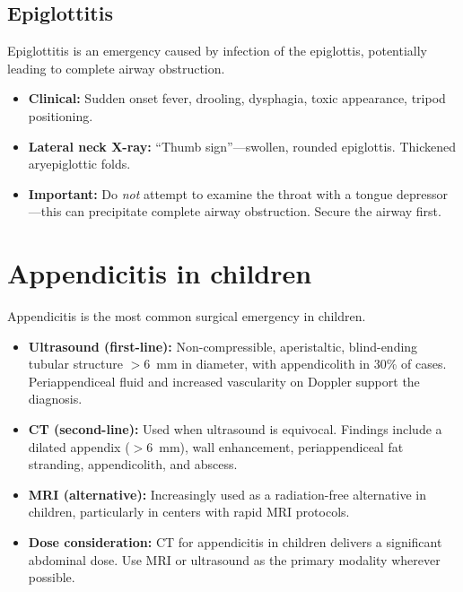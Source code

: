 \subsection{Epiglottitis}
Epiglottitis is an emergency caused by infection of the epiglottis, potentially leading to complete airway obstruction.
\begin{itemize}
    \item \textbf{Clinical:} Sudden onset fever, drooling, dysphagia, toxic appearance, tripod positioning.
    \item \textbf{Lateral neck X-ray:} ``Thumb sign''---swollen, rounded epiglottis. Thickened aryepiglottic folds.
    \item \textbf{Important:} Do \emph{not} attempt to examine the throat with a tongue depressor---this can precipitate complete airway obstruction. Secure the airway first.
\end{itemize}

\section{Appendicitis in children}
Appendicitis is the most common surgical emergency in children.
\begin{itemize}
    \item \textbf{Ultrasound (first-line):} Non-compressible, aperistaltic, blind-ending tubular structure $>$6~mm in diameter, with appendicolith in 30\% of cases. Periappendiceal fluid and increased vascularity on Doppler support the diagnosis.
    \item \textbf{CT (second-line):} Used when ultrasound is equivocal. Findings include a dilated appendix ($>$6~mm), wall enhancement, periappendiceal fat stranding, appendicolith, and abscess.
    \item \textbf{MRI (alternative):} Increasingly used as a radiation-free alternative in children, particularly in centers with rapid MRI protocols.
    \item \textbf{Dose consideration:} CT for appendicitis in children delivers a significant abdominal dose. Use MRI or ultrasound as the primary modality wherever possible.
\end{itemize}

